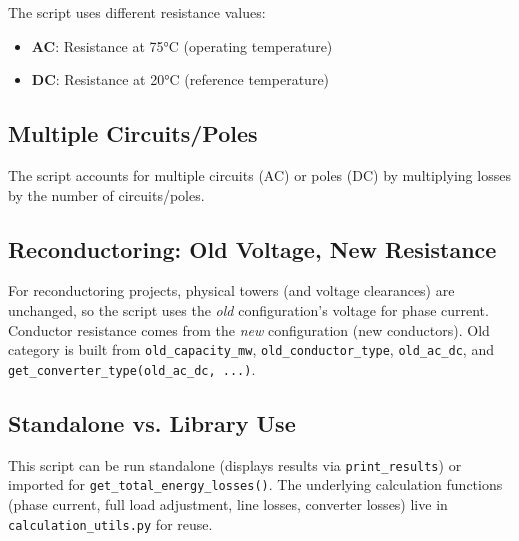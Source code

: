 \documentclass[ctcc_full_documentation.tex]{subfiles}
\begin{document}
The script uses different resistance values:
\begin{itemize}
    \item \textbf{AC}: Resistance at 75°C (operating temperature)
    \item \textbf{DC}: Resistance at 20°C (reference temperature)
\end{itemize}

\subsection{Multiple Circuits/Poles}

The script accounts for multiple circuits (AC) or poles (DC) by multiplying losses by the number of circuits/poles.

\subsection{Reconductoring: Old Voltage, New Resistance}

For reconductoring projects, physical towers (and voltage clearances) are unchanged, so the script uses the \emph{old} configuration's voltage for phase current. Conductor resistance comes from the \emph{new} configuration (new conductors). Old category is built from \texttt{old\_capacity\_mw}, \texttt{old\_conductor\_type}, \texttt{old\_ac\_dc}, and \texttt{get\_converter\_type(old\_ac\_dc, ...)}.

\subsection{Standalone vs. Library Use}

This script can be run standalone (displays results via \texttt{print\_results}) or imported for \texttt{get\_total\_energy\_losses()}. The underlying calculation functions (phase current, full load adjustment, line losses, converter losses) live in \texttt{calculation\_utils.py} for reuse.
\end{document}

